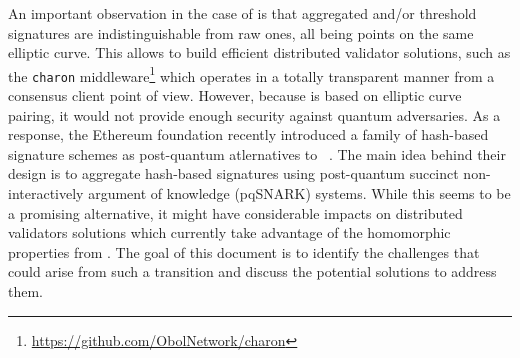 An important observation in the case of \BLS is that aggregated and/or threshold \BLS signatures are indistinguishable from raw ones, all being points on the same elliptic curve.
This allows to build efficient distributed validator solutions, such as the \texttt{charon} middleware\footnote{\url{https://github.com/ObolNetwork/charon}} which operates in a totally transparent manner from a consensus client point of view.
However, because \BLS is based on elliptic curve pairing, it would not provide enough security against quantum adversaries.
As a response, the Ethereum foundation recently introduced a family of hash-based signature schemes as post-quantum atlernatives to \BLS~\cite{cryptoeprint:2025/055}.
The main idea behind their design is to aggregate hash-based signatures using post-quantum succinct non-interactively argument of knowledge (pqSNARK) systems.%
While this seems to be a promising alternative, it might have considerable impacts on distributed validators solutions which currently take advantage of the homomorphic properties from \BLS.
The goal of this document is to identify the challenges that could arise from such a transition and discuss the potential solutions to address them.

